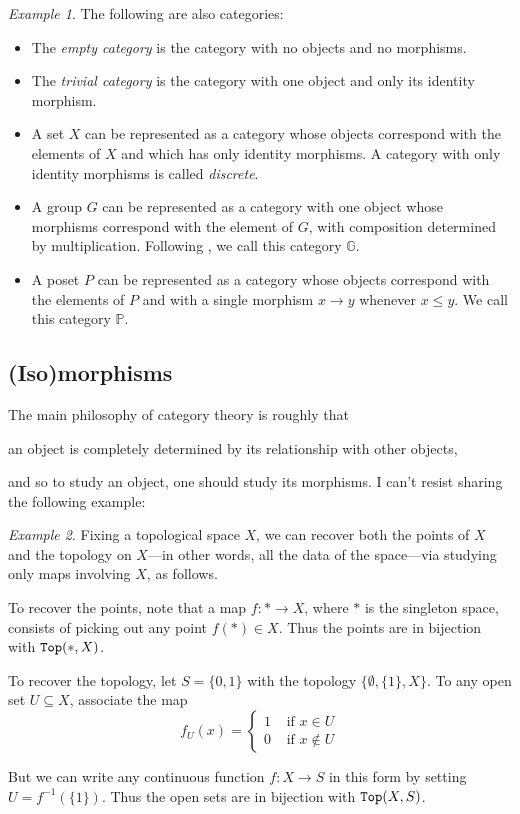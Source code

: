 \documentclass[11 pt]{amsart}
\theoremstyle{plain}   %
\theoremstyle{definition}
\theoremstyle{remark}
\newtheorem{ex}{Example}[section]
\numberwithin{equation}{section}
\def\GG{\mathbb{G}}
\def\PP{\mathbb{P}}
\newcommand{\cat}[1]{{\normalfont\texttt{#1}}}
\begin{document}
\begin{ex}\label{abstract categories} The following are also categories:
	\begin{itemize}
		\item The \emph{empty category} is the category with no objects and no
		      morphisms.
		\item The \emph{trivial category} is the category with one object and only
		      its identity morphism.
		\item A set $X$ can be represented as a category whose objects correspond with the elements
		      of $X$ and which has only identity morphisms. A category with only
		      identity morphisms is called \emph{discrete}.
		\item A group $G$ can be represented as a category with one object whose
		      morphisms correspond with the element of $G$, with composition
		      determined by multiplication. Following \cite{Porter}, we call this
		      category $\GG$.
		\item A poset $P$ can be represented as a category whose objects correspond
		      with the elements of $P$ and with a single morphism $x\rightarrow y$
		      whenever $x\leq y$. We call this category $\PP$.
	\end{itemize}
\end{ex}

\subsection{(Iso)morphisms}

The main philosophy of category theory is roughly that

\begin{displayquote}
	an object is completely determined by its relationship with other objects,
	\cite[p. 8]{Bradley}
\end{displayquote}

and so to study an object, one should study its morphisms. I can't resist
sharing the following example:

\begin{ex}\cite[Example 2.1.6(ii)]{Riehl}
	Fixing a topological space $X$, we can recover both the points of $X$ and the
	topology on $X$---in other words, all the data of the space---via studying
	only maps involving $X$, as follows.

	To recover the points, note that a map $f: *\rightarrow X$, where $*$ is the
	singleton space, consists of picking out any point $f(*)\in X$. Thus the
	points are in bijection with $\cat{Top}(*, X)$.

	To recover the topology, let $S = \{0, 1\}$ with the topology $\{\emptyset,
		\{1\}, X\}$. To any open set $U\subseteq X$, associate the map
	$$f_U(x) = \begin{cases}
			1 & \text{ if }x\in U    \\
			0 & \text{ if }x\notin U
		\end{cases}$$

	But we can write any continuous function $f: X\rightarrow S$ in this form by
	setting $U = f^{-1}(\{1\})$. Thus the open sets are in bijection with
	$\cat{Top}(X, S)$.
\end{ex}
\end{document}
